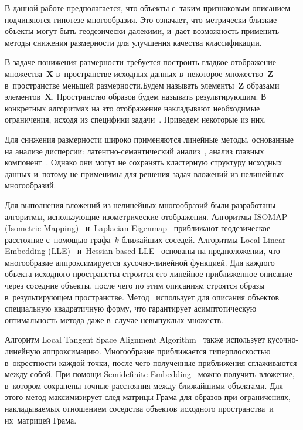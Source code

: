 \begin{multicols}{2}
В данной работе предполагается, что объекты с~таким признаковым описанием
 подчиняются гипотезе многообразия. Это означает, что метрически близкие объекты 
 могут быть геодезически далекими, и~дает возможность применить методы снижения 
 размерности для улучшения качества классификации.

В задаче понижения размерности требуется построить гладкое отображение 
множества~$\mathbf{X}$ в~пространстве исходных данных в~некоторое 
мно\-же\-ст\-во~$\mathbf{Z}$ в~пространстве меньшей размерности.\linebreak Будем называть 
элементы~$\mathbf{Z}$ образами элементов~$\mathbf{X}$. Пространство образов 
будем называть результирующим.
В конкретных алгоритмах на это отображение накладывают необходимые ограничения, 
исходя из специфики задачи~\cite{fodor2002survey}. Приведем некоторые из них.

Для снижения размерности широко применяются линейные методы, основанные на 
анализе дисперсии: латентно-семантический 
анализ~\cite{brooke2012paragraph, brooke2012unsupervised}, анализ главных 
компонент~\cite{gorban2008principal}. Одна\-ко они могут не сохранять кластерную 
структуру исходных данных и~потому не применимы для решения задач вложений из 
нелинейных мно\-го\-об\-разий.
{ %

}

Для выполнения вложений из нелинейных многообразий были разработаны алгоритмы, 
использующие изометрические отображения. Алгоритмы ISOMAP
(Isometric Mapping)~\cite{tenenbaum2000global} 
и~Laplacian Eigenmap~\cite{belkin2001laplacian} приближают геодезическое расстояние 
с~по\-мощью графа~$k$ ближайших соседей. Алгоритмы Local Linear 
Embedding (LLE)~\cite{roweis2000nonlinear} и~Hessian-based LLE~\cite{donoho2003hessian} основаны на предположении, что 
многообразие аппроксимируется ку\-соч\-но-ли\-ней\-ной функцией. Для каждого 
объекта исходного пространства строится его линейное приближенное описание 
через соседние объекты, после чего по этим описаниям строятся образы в~ре\-зуль\-ти\-ру\-ющем 
пространстве. Метод~\cite{donoho2003hessian} использует для описания объектов 
специальную квадратичную форму, что гарантирует асимптотическую оптимальность 
метода даже в~случае невыпуклых множеств.

Алгоритм Local Tangent Space Alignment Algorithm~\cite{zhang2004principal} 
также использует ку\-соч\-но-ли\-ней\-ную аппроксимацию. Многообразие приближается 
гиперплоскостью в~окрестности каждой точки, после чего полученные приближения 
сглаживаются между собой. При помощи Semidefinite 
Embedding~\cite{weinberger2006unsupervised} можно получить вложение, в~котором 
сохранены точные расстояния между ближайшими объектами. Для этого метод 
максимизирует след матрицы Грама для образов при ограничениях, накладываемых 
отношением соседства объектов исходного пространства~и их~матрицей Грама.


\end{multicols}
